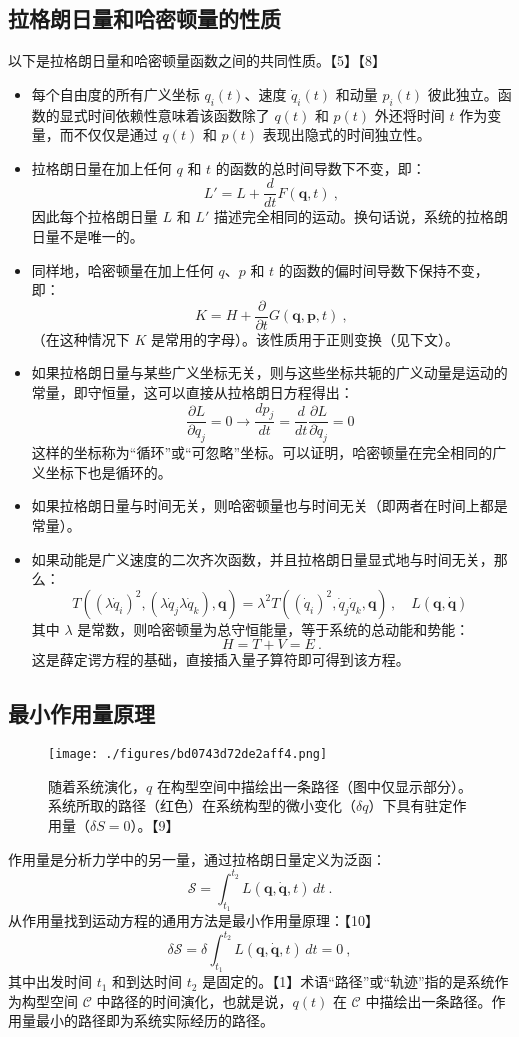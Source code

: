 \subsection{拉格朗日量和哈密顿量的性质}  
以下是拉格朗日量和哈密顿量函数之间的共同性质。【5】【8】
\begin{itemize}
\item 每个自由度的所有广义坐标 \( q_i(t) \)、速度 \( \dot{q}_i(t) \) 和动量 \( p_i(t) \) 彼此独立。函数的显式时间依赖性意味着该函数除了 \( q(t) \) 和 \( p(t) \) 外还将时间 \( t \) 作为变量，而不仅仅是通过 \( q(t) \) 和 \( p(t) \) 表现出隐式的时间独立性。
\item 拉格朗日量在加上任何 \( q \) 和 \( t \) 的函数的总时间导数下不变，即：
\[
L' = L + \frac{d}{dt}F(\mathbf{q}, t) ~,
\]
因此每个拉格朗日量 \( L \) 和 \( L' \) 描述完全相同的运动。换句话说，系统的拉格朗日量不是唯一的。
\item 同样地，哈密顿量在加上任何 \( q \)、\( p \) 和 \( t \) 的函数的偏时间导数下保持不变，即：
\[
K = H + \frac{\partial}{\partial t}G(\mathbf{q}, \mathbf{p}, t) ~,
\]
（在这种情况下 \( K \) 是常用的字母）。该性质用于正则变换（见下文）。
\item 如果拉格朗日量与某些广义坐标无关，则与这些坐标共轭的广义动量是运动的常量，即守恒量，这可以直接从拉格朗日方程得出：
\[
\frac{\partial L}{\partial q_j} = 0 \rightarrow \frac{dp_j}{dt} = \frac{d}{dt} \frac{\partial L}{\partial \dot{q}_j} = 0~
\]
这样的坐标称为“循环”或“可忽略”坐标。可以证明，哈密顿量在完全相同的广义坐标下也是循环的。
\item 如果拉格朗日量与时间无关，则哈密顿量也与时间无关（即两者在时间上都是常量）。  
\item 如果动能是广义速度的二次齐次函数，并且拉格朗日量显式地与时间无关，那么：
\[
T((\lambda \dot{q}_i)^2, (\lambda \dot{q}_j \lambda \dot{q}_k), \mathbf{q}) = \lambda^2 T((\dot{q}_i)^2, \dot{q}_j \dot{q}_k, \mathbf{q}) \,, \quad L(\mathbf{q}, \mathbf{\dot{q}})~
\]
其中 \( \lambda \) 是常数，则哈密顿量为总守恒能量，等于系统的总动能和势能：
\[
H = T + V = E ~.
\]
这是薛定谔方程的基础，直接插入量子算符即可得到该方程。
\end{itemize}
\subsection{最小作用量原理}
\begin{figure}[ht]
\centering
\texttt{[image: ./figures/bd0743d72de2aff4.png]}
\caption{随着系统演化，\( q \) 在构型空间中描绘出一条路径（图中仅显示部分）。系统所取的路径（红色）在系统构型的微小变化（\( \delta q \)）下具有驻定作用量（\( \delta S = 0 \)）。【9】} \label{fig_FXL_1}
\end{figure}
作用量是分析力学中的另一量，通过拉格朗日量定义为泛函：
\[
\mathcal{S} = \int_{t_1}^{t_2} L(\mathbf{q}, \mathbf{\dot{q}}, t) \, dt ~.
\]
从作用量找到运动方程的通用方法是最小作用量原理：【10】
\[
\delta \mathcal{S} = \delta \int_{t_1}^{t_2} L(\mathbf{q}, \mathbf{\dot{q}}, t) \, dt = 0 ~,
\]
其中出发时间 \( t_1 \) 和到达时间 \( t_2 \) 是固定的。【1】术语“路径”或“轨迹”指的是系统作为构型空间 \( \mathcal{C} \) 中路径的时间演化，也就是说，\( q(t) \) 在 \( \mathcal{C} \) 中描绘出一条路径。作用量最小的路径即为系统实际经历的路径。


